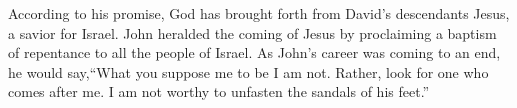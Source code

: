 \lettrine[lines=3]{A}{}ccording to his promise, God has brought forth from David’s descendants Jesus, a savior for Israel. John heralded the coming of Jesus by proclaiming a baptism of repentance to all the people of Israel. As John’s career was coming to an end, he would say,``What you suppose me to be I am not. Rather, look for one who comes after me. I am not worthy to unfasten the sandals of his feet.”
